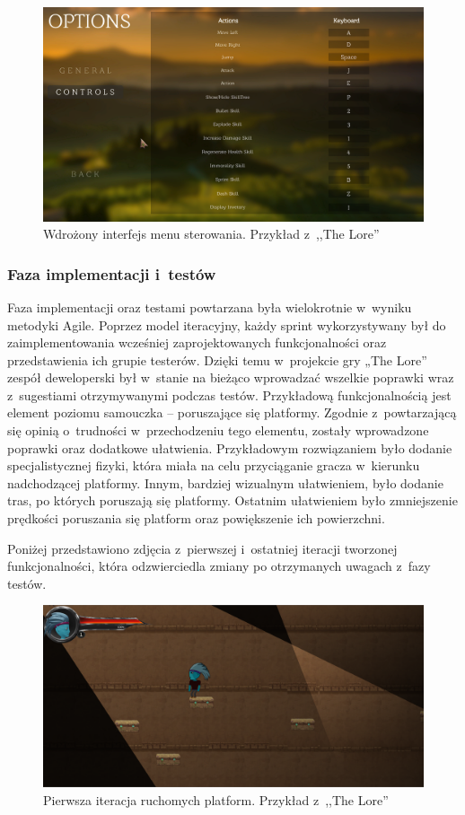 \documentclass[oneside,polski,logo]{amuthesis}
\begin{document}
\begin{figure}[h]
	\centering
	\includegraphics[width=14cm]{images/hyps/of2.png}
	\caption{Wdrożony interfejs menu sterowania. Przykład z~,,The Lore''}
\end{figure}

\subsubsection{Faza implementacji i~testów}

Faza implementacji oraz testami powtarzana była wielokrotnie w~wyniku metodyki Agile. Poprzez model iteracyjny, każdy sprint wykorzystywany był do zaimplementowania wcześniej zaprojektowanych funkcjonalności oraz przedstawienia ich grupie testerów. Dzięki temu w~projekcie gry „The Lore” zespół deweloperski był w~stanie na bieżąco wprowadzać wszelkie poprawki wraz z~sugestiami otrzymywanymi podczas testów. Przykładową funkcjonalnością jest element poziomu samouczka – poruszające się platformy. Zgodnie z~powtarzającą się opinią o~trudności w~przechodzeniu tego elementu, zostały wprowadzone poprawki oraz dodatkowe ułatwienia. Przykładowym rozwiązaniem było dodanie specjalistycznej fizyki, która miała na celu przyciąganie gracza w~kierunku nadchodzącej platformy. Innym, bardziej wizualnym ułatwieniem, było dodanie tras, po których poruszają się platformy. Ostatnim ułatwieniem było zmniejszenie prędkości poruszania się platform oraz powiększenie ich powierzchni.

Poniżej przedstawiono zdjęcia z~pierwszej i~ostatniej iteracji tworzonej funkcjonalności, która odzwierciedla zmiany po otrzymanych uwagach z~fazy testów.

\begin{figure}[h]
	\centering
	\includegraphics[width=14cm]{images/hyps/platfBef.png}
	\caption{Pierwsza iteracja ruchomych platform. Przykład z~,,The Lore''}
\end{figure}
\end{document}
